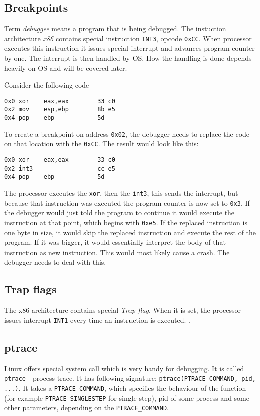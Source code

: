\subsection{Breakpoints}
Term \textit{debuggee} means a program that is being debugged. The instuction architecture \textit{x86} contains special instruction \texttt{INT3}, opcode \texttt{0xCC}. When processor executes this instruction it issues special interrupt and advances program counter by one. The interrupt is then handled by OS. How the handling is done depends heavily on OS and will be covered later.

Consider the following code 
\begin{verbatim}
0x0 xor    eax,eax        33 c0
0x2 mov    esp,ebp        8b e5
0x4 pop    ebp            5d
\end{verbatim}
To create a breakpoint on address \texttt{0x02}, the debugger needs to replace the code on that location with the \texttt{0xCC}. The result would look like this:
\begin{verbatim}
0x0 xor    eax,eax        33 c0
0x2 int3                  cc e5
0x4 pop    ebp            5d
\end{verbatim}
The processor executes the \texttt{xor}, then the \texttt{int3}, this sends the interrupt, but because that instruction was executed the program counter is now set to \texttt{0x3}. If the debugger would just told the program to continue it would execute the instruction at that point, which begins with \texttt{0xe5}. If the replaced instruction is one byte in size, it would skip the replaced instruction and execute the rest of the program. If it was bigger, it would essentially interpret the body of that instruction as new instruction. This would most likely cause a crash. The debugger needs to deal with this. 

\subsection{Trap flags}
The x86 architecture contains special \textit{Trap flag}. When it is set, the processor issues interrupt \texttt{INT1} every time an instruction is executed. .

\subsection{ptrace}
Linux offers special system call which is very handy for debugging. It is called \texttt{ptrace} \cite{ptrace} - process trace. It has following signature: \texttt{ptrace(PTRACE_COMMAND, pid, ...)}. It takes a \texttt{PTRACE_COMMAND}, which specifies the behaviour of the function (for example \texttt{PTRACE_SINGLESTEP} for single step), pid of some process and some other parameters, depending on the \texttt{PTRACE_COMMAND}. 

